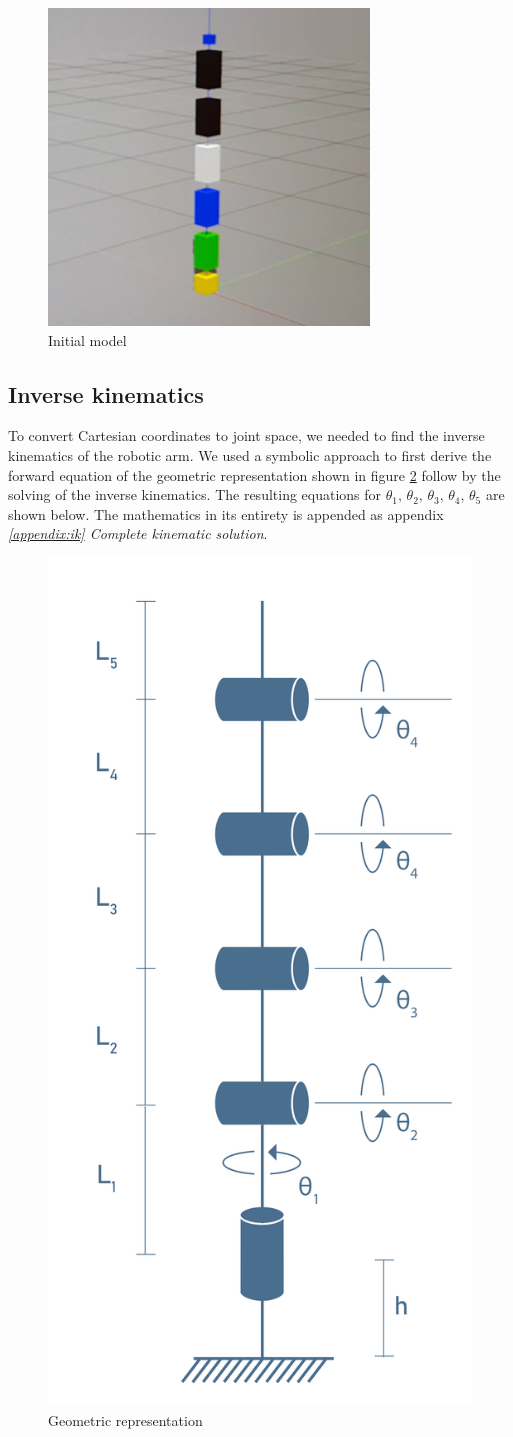 \documentclass[11pt,a4paper, titlepage]{article}
\begin{document}
	\begin{figure}[H]
		\centering
		\includegraphics[width=0.5\linewidth]{../Diagrams/URDF-first.png}
		\caption{Initial model}
		\label{fig:init-model}
	\end{figure}
	
	\subsection{Inverse kinematics}
	\label{invkin}
	To convert Cartesian coordinates to joint space, we needed to find the inverse kinematics of the robotic arm. We used a symbolic approach to first derive the forward equation of the geometric representation shown in figure \ref{fig:geometric} follow by the solving of the inverse kinematics. The resulting equations for $\theta_1,\,\theta_2,\,\theta_3,\,\theta_4,\,\theta_5$ are shown below. The mathematics in its entirety is appended as appendix \textit{\ref{appendix:ik} Complete kinematic solution}.
	
	\begin{figure}[H]
		\centering
		\includegraphics[width=0.3\linewidth]{../Diagrams/Model.png}
		\caption{Geometric representation}
		\label{fig:geometric}
	\end{figure}
	
\end{document}
